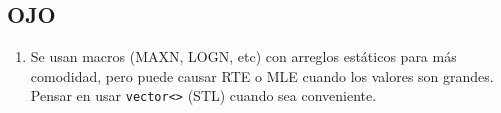 \subsection{OJO}
\begin{enumerate}[1.]
    \item Se usan macros (MAXN, LOGN, etc) con arreglos estáticos para más comodidad, pero puede causar RTE o MLE cuando los valores son grandes. Pensar en usar \texttt{vector<>} (STL) cuando sea conveniente.
\end{enumerate}